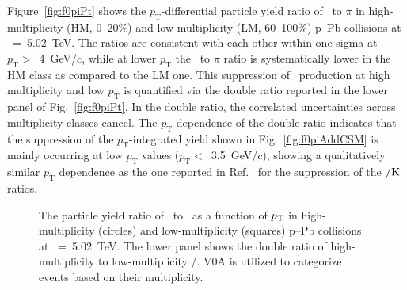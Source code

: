 Figure~\ref{fig:f0piPt} shows the $p_{\mathrm{T}}$-differential particle yield ratio of \fzero~to $\pi$ in high-multiplicity (HM, 0--20\%) and low-multiplicity (LM, 60--100\%) p--Pb collisions at \snn~=~5.02~TeV. The ratios are consistent with each other within one sigma at $p_{\mathrm{T}}>$~4~GeV/$c$, while at lower $p_{\mathrm{T}}$ the \fzero~to $\pi$ ratio is systematically lower in the HM class as compared to the LM one. This suppression of \fzero~production at high multiplicity and low $p_{\mathrm{T}}$ is quantified via the double ratio reported in the lower panel of Fig.~\ref{fig:f0piPt}. In the double ratio, the correlated uncertainties across multiplicity classes cancel. The $p_{\mathrm{T}}$ dependence of the double ratio indicates that the suppression of the $p_{\mathrm{T}}$-integrated yield shown in Fig.~\ref{fig:f0piAddCSM} is mainly occurring at low $p_{\mathrm{T}}$ values ($p_{\mathrm{T}}<$~3.5~GeV/$c$), showing a qualitatively similar $p_{\mathrm{T}}$ dependence as the one reported in Ref.~\cite{ALICE:2019etb} for the suppression of the \kstar$\rm{}/K$ ratios.

\begin{figure}[!hbt]
	\centering
	\caption{The particle yield ratio of \fzero~to \kstar~as a function of $p_{\rm{T}}$ in high-multiplicity (circles) and low-multiplicity (squares) p--Pb collisions at \snn~=~5.02~TeV. The lower panel shows the double ratio of high-multiplicity to low-multiplicity \fzero/\kstar. V0A is utilized to categorize events based on their multiplicity. }
	\label{fig:f0KsPt}
\end{figure}

